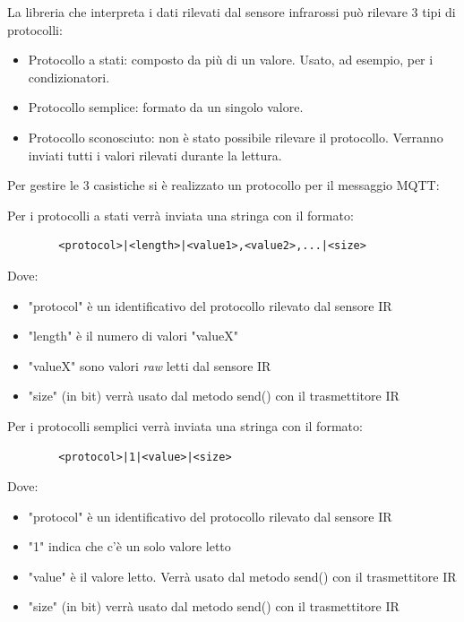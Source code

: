 \documentclass[a4paper,11pt]{article}
\begin{document}
    La libreria che interpreta i dati rilevati dal sensore infrarossi può rilevare 3 tipi di protocolli:
    \begin{itemize}
        \item Protocollo a stati: composto da più di un valore. Usato, ad esempio, per i condizionatori.
        \item Protocollo semplice: formato da un singolo valore.
        \item Protocollo sconosciuto: non è stato possibile rilevare il protocollo. Verranno inviati tutti i valori rilevati durante la lettura.
    \end{itemize}

    \noindent
    Per gestire le 3 casistiche si è realizzato un protocollo per il messaggio MQTT:
    \smallskip

    \begin{samepage}
      Per i protocolli a stati verrà inviata una stringa con il formato:

      \begin{verbatim}
        <protocol>|<length>|<value1>,<value2>,...|<size>
      \end{verbatim}
              
      Dove:
      \begin{itemize}
          \item "protocol" è un identificativo del protocollo rilevato dal sensore IR
          \item "length" è il numero di valori "valueX"
          \item "valueX" sono valori \emph{raw} letti dal sensore IR
          \item "size" (in bit) verrà usato dal metodo send() con il trasmettitore IR
      \end{itemize}
    \end{samepage}

    \bigskip

    \begin{samepage}
      Per i protocolli semplici verrà inviata una stringa con il formato:

      \begin{verbatim}
        <protocol>|1|<value>|<size>
      \end{verbatim}

      Dove:
      \begin{itemize}
          \item "protocol" è un identificativo del protocollo rilevato dal sensore IR
          \item "1" indica che c'è un solo valore letto
          \item "value" è il valore letto. Verrà usato dal metodo send() con il trasmettitore IR
          \item "size" (in bit) verrà usato dal metodo send() con il trasmettitore IR
      \end{itemize}
    \end{samepage}
\end{document}
